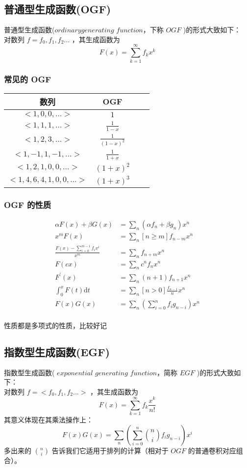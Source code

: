 	\subsection{普通型生成函数(OGF)}
	普通型生成函数($ordinary$​ $generating$ $function$，下称 $OGF$ )的形式大致如下：\\
	对数列 $f=f_0,f_1,f_2... $ ，其生成函数为
	$$
	F(x)=\sum_{k=1}^{\infty}f_kx^k
	$$
	\subsubsection{常见的 OGF}
	\begin{center}
		\renewcommand\arraystretch{2.3}
		\renewcommand\tabcolsep{40.0pt}
		\begin{tabular}{ccc|c}
			\hline
			\hline
			数列&OGF\\
			\hline
			$<1,0,0,...>$&$\displaystyle 1$\\
			$<1,1,1,...>$&$\displaystyle \frac{1}{1-x}$\\
			$<1,2,3,...>$&$\displaystyle \frac{1}{(1-x)^2}$\\
			$<1,-1,1,-1,...>$&$\displaystyle \frac{1}{1+x}$\\
			$<1,2,1,0,0,...>$&$\displaystyle (1+x)^2$\\
			$<1,4,6,4,1,0,0,...>$&$\displaystyle (1+x)^3$\\
			\hline
			\hline
		\end{tabular}	
	\end{center}
	\subsubsection{ OGF 的性质}
	$$
	\begin{aligned}
	\alpha F(x)+\beta G(x)&=\sum_n(\alpha f_n+\beta g_n)x^n\\
	x^mF(x)&=\sum_n[n\geq m]f_{n-m}x^n\\
	\frac{F(x)-\sum_{i=0}^{m-1}f_ix^i}{x^m}&=\sum_nf_{n+m}x^n\\
	F(cx)&=\sum_nc^nf_nx^n\\
	F^\prime(x)&=\sum_n(n+1)f_{n+1}x^n\\
	\int_0^xF(t)\mathrm{d}t&=\sum_n[n>0]\frac{f_{n-1}}nx^n\\
	F(x)G(x)&=\sum_n\left(\sum_{i=0}^nf_ig_{n-i}\right)x^n
	\end{aligned}
	$$\\
	性质都是多项式的性质，比较好记
	\newpage
	\subsection{指数型生成函数(EGF)}
	指数型生成函数( $exponential$ $generating$ $function$，简称 $EGF$ )的形式大致如下：\\
	对数列 $f=<f_0,f_1,f_2...>$ ，其生成函数为
	$$
	F(x)=\sum_{k=1}^{\infty}f_k\frac{x^k}{n!}
	$$
	其意义体现在其乘法操作上： 
	$$
	F(x)G(x)=\sum_n\left(\sum_{i=0}^n\binom nif_ig_{n-i}\right)x^i
	$$
	多出来的 $\binom{n}{i}$ 告诉我们它适用于排列的计算（相对于 $OGF$ 的普通卷积对应组合）。
